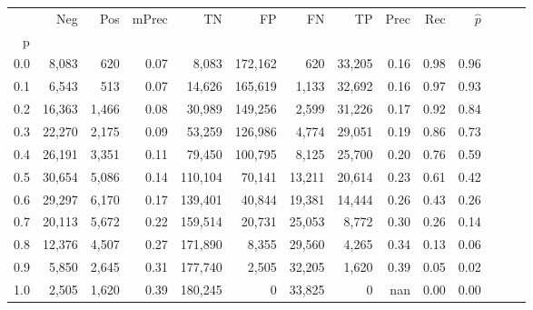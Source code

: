 \begin{tabular}{rrrrrrrrrrrrrr}
\toprule
{} &     Neg &    Pos & mPrec &       TN &       FP &      FN &      TP &  Prec &   Rec & $\hat{p}$ \\
p   &         &        &       &          &          &         &         &       &       &           \\
\midrule
0.0 &   8,083 &    620 &  0.07 &    8,083 &  172,162 &     620 &  33,205 &  0.16 &  0.98 &      0.96 \\
0.1 &   6,543 &    513 &  0.07 &   14,626 &  165,619 &   1,133 &  32,692 &  0.16 &  0.97 &      0.93 \\
0.2 &  16,363 &  1,466 &  0.08 &   30,989 &  149,256 &   2,599 &  31,226 &  0.17 &  0.92 &      0.84 \\
0.3 &  22,270 &  2,175 &  0.09 &   53,259 &  126,986 &   4,774 &  29,051 &  0.19 &  0.86 &      0.73 \\
0.4 &  26,191 &  3,351 &  0.11 &   79,450 &  100,795 &   8,125 &  25,700 &  0.20 &  0.76 &      0.59 \\
0.5 &  30,654 &  5,086 &  0.14 &  110,104 &   70,141 &  13,211 &  20,614 &  0.23 &  0.61 &      0.42 \\
0.6 &  29,297 &  6,170 &  0.17 &  139,401 &   40,844 &  19,381 &  14,444 &  0.26 &  0.43 &      0.26 \\
0.7 &  20,113 &  5,672 &  0.22 &  159,514 &   20,731 &  25,053 &   8,772 &  0.30 &  0.26 &      0.14 \\
0.8 &  12,376 &  4,507 &  0.27 &  171,890 &    8,355 &  29,560 &   4,265 &  0.34 &  0.13 &      0.06 \\
0.9 &   5,850 &  2,645 &  0.31 &  177,740 &    2,505 &  32,205 &   1,620 &  0.39 &  0.05 &      0.02 \\
1.0 &   2,505 &  1,620 &  0.39 &  180,245 &        0 &  33,825 &       0 &   nan &  0.00 &      0.00 \\
\bottomrule
\end{tabular}
